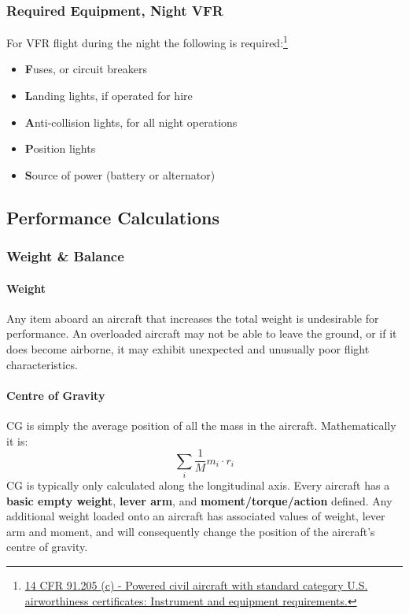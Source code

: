 \documentclass[12pt]{article}
\begin{document}
		\subsubsection{Required Equipment, Night VFR}
			For VFR flight during the night the following is required:\footnote{\href{https://www.law.cornell.edu/cfr/text/14/91.205\#c}{14 CFR 91.205 (c) - Powered civil aircraft with standard category U.S. airworthiness certificates: Instrument and equipment requirements.}}
			\begin{itemize}
				\item \textbf{F}uses, or circuit breakers
				\item \textbf{L}anding lights, if operated for hire
				\item \textbf{A}nti-collision lights, for all night operations
				\item \textbf{P}osition lights
				\item \textbf{S}ource of power (battery or alternator)
			\end{itemize}
	\subsection{Performance Calculations}
		\subsubsection{Weight \& Balance}
			\paragraph{Weight} Any item aboard an aircraft that increases the total weight is undesirable for performance. An overloaded aircraft may not be able to leave the ground, or if it does become airborne, it may exhibit unexpected and unusually poor flight characteristics. 
			\paragraph{Centre of Gravity} CG is simply the average position of all the mass in the aircraft. Mathematically it is: $$\sum_i \frac{1}{M} m_i\cdot r_i $$ CG is typically only calculated along the longitudinal axis. Every aircraft has a \textbf{basic empty weight}, \textbf{lever arm}, and \textbf{moment/torque/action} defined. Any additional weight loaded onto an aircraft has associated values of weight, lever arm and moment, and will consequently change the position of the aircraft's centre of gravity.
\end{document}
